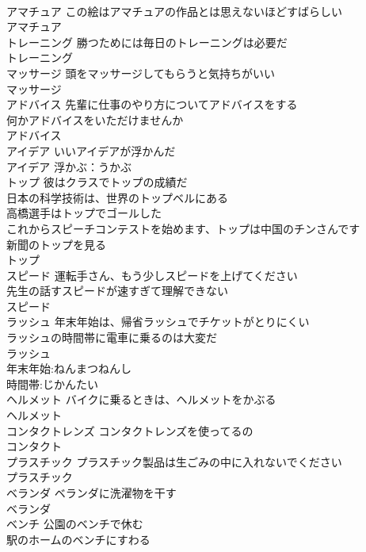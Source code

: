 \documentclass[8pt]{extreport}
\begin{document}
\begin{CJK}{UTF8}{min}
\\	アマチュア	この絵はアマチュアの作品とは思えないほどすばらしい 
\\	アマチュア			
\\	トレーニング	勝つためには毎日のトレーニングは必要だ 
\\	トレーニング			
\\	マッサージ	頭をマッサージしてもらうと気持ちがいい 
\\	マッサージ			
\\	アドバイス	先輩に仕事のやり方についてアドバイスをする 
\\	何かアドバイスをいただけませんか 
\\	アドバイス			
\\	アイデア	いいアイデアが浮かんだ 
\\	アイデア			浮かぶ：うかぶ
\\	トップ	彼はクラスでトップの成績だ 
\\	日本の科学技術は、世界のトップベルにある 
\\	高橋選手はトップでゴールした 
\\	これからスピーチコンテストを始めます、トップは中国のチンさんです 
\\	新聞のトップを見る 
\\	トップ			
\\	スピード	運転手さん、もう少しスピードを上げてください 
\\	先生の話すスピードが速すぎて理解できない 
\\	スピード			
\\	ラッシュ	年末年始は、帰省ラッシュでチケットがとりにくい 
\\	ラッシュの時間帯に電車に乗るのは大変だ 
\\	ラッシュ			
\\	年末年始:ねんまつねんし
\\	時間帯:じかんたい
\\	ヘルメット	バイクに乗るときは、ヘルメットをかぶる 
\\	ヘルメット			
\\	コンタクトレンズ	コンタクトレンズを使ってるの 
\\	コンタクト			
\\	プラスチック	プラスチック製品は生ごみの中に入れないでください 
\\	プラスチック			
\\	ベランダ	ベランダに洗濯物を干す 
\\	ベランダ			
\\	ベンチ	公園のベンチで休む 
\\	駅のホームのベンチにすわる 

\end{CJK}
\end{document}
